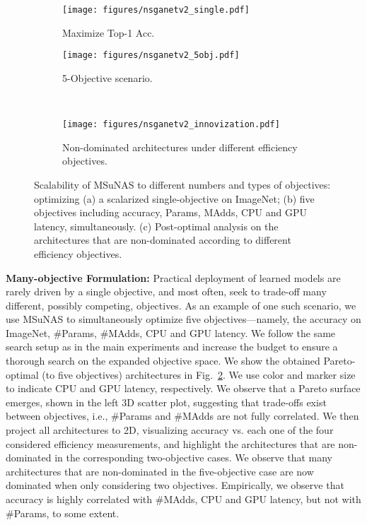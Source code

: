 \documentclass[runningheads]{llncs}
\def\ourmethod{MSuNAS}
\begin{document}
\begin{figure}[!tbh]
    \begin{subfigure}[b]{0.38\textwidth}
    \centering
    \texttt{[image: figures/nsganetv2\_single.pdf]}
    \caption{Maximize Top-1 Acc.
    \label{fig:nsganetv2_single}}
    \end{subfigure}\hfill
    \begin{subfigure}[b]{0.6\textwidth}
    \centering
    \texttt{[image: figures/nsganetv2\_5obj.pdf]}
    \caption{5-Objective scenario.
    \label{fig:nsganetv2_5obj}}
    \end{subfigure}\\
    \centering
    \begin{subfigure}{0.95\textwidth}
    \texttt{[image: figures/nsganetv2\_innovization.pdf]}
    \caption{Non-dominated architectures under different efficiency objectives.
    \label{fig:nsganetv2_innovization}}
    \end{subfigure}
\caption{Scalability of \ourmethod{} to different numbers and types of objectives: optimizing (a) a scalarized single-objective on ImageNet; (b) five objectives including accuracy, Params, MAdds, CPU and GPU latency, simultaneously. (c) Post-optimal analysis on the architectures that are non-dominated according to different efficiency objectives.}
\label{fig:image2}
\end{figure}

\noindent\textbf{Many-objective Formulation:} Practical deployment of learned models are rarely driven by a single objective, and most often, seek to trade-off many different, possibly competing, objectives. As an example of one such scenario, we use \ourmethod{} to simultaneously optimize five objectives---namely, the accuracy on ImageNet, \#Params, \#MAdds, CPU and GPU latency. We follow the same search setup as in the main experiments and increase the budget to ensure a thorough search on the expanded objective space. We show the obtained Pareto-optimal (to five objectives) architectures in Fig.~\ref{fig:nsganetv2_5obj}. We use color and marker size to indicate CPU and GPU latency, respectively. We observe that a Pareto surface emerges, shown in the left 3D scatter plot, suggesting that trade-offs exist between objectives, i.e., \#Params and \#MAdds are not fully correlated. We then project all architectures to 2D, visualizing accuracy vs. each one of the four considered efficiency measurements, and highlight the architectures that are non-dominated in the corresponding two-objective cases. We observe that many architectures that are non-dominated in the five-objective case are now dominated when only considering two objectives. Empirically, we observe that accuracy is highly correlated with \#MAdds, CPU and GPU latency, but not with \#Params, to some extent.
\end{document}
